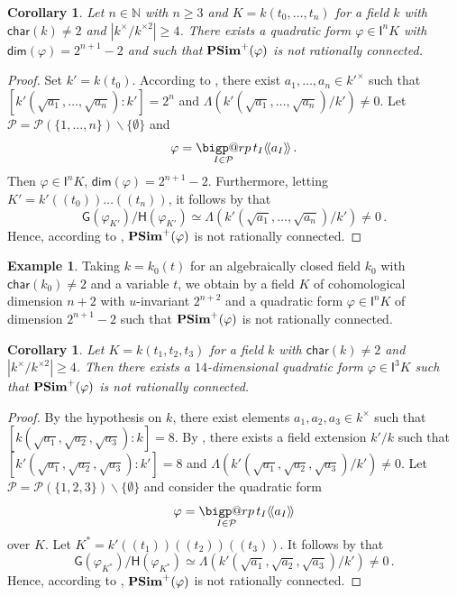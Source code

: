 \documentclass[twoside,11pt]{amsart}
\makeatletter
\numberwithin{equation}{section}
\newtheorem{cor}[equation]{Corollary}
\theoremstyle{definition}
\newtheorem{ex}[equation]{Example}
\renewcommand{\dim}{\operatorname{\mathsf{dim}}}
\newcommand{\car}{\mathsf{char}}
\newcommand{\mg}[1]{{#1}^{\times}}
\newcommand{\sq}[1]{{#1}^{\times 2}}
\newcommand{\scg}[1]{\mg{#1}/\sq{#1}}
\newcommand{\nat}{\mathbb{N}}
\newcommand{\la}{\langle}
\newcommand{\ra}{\rangle}
\newcommand{\lla}{\la\!\la}
\newcommand{\rra}{\ra\!\ra}
\renewcommand{\geq}{\geqslant}
\newcommand{\I}{\mathsf{I}}
\newcommand{\mc}{\mathcal}
\newcommand{\G}{\mathsf{G}}
\renewcommand{\H}{\mathsf{H}}
\renewcommand{\setminus}{\smallsetminus}
\renewcommand{\dim}{\mathsf{dim}}
\renewcommand{\geq}{\geqslant}
\renewcommand{\setminus}{\smallsetminus}
\newcommand{\bigperp}{%
  \mathop{\mathpalette\bigp@rp\relax}%
  \displaylimits
}
\newcommand{\bigp@rp}[2]{%
  \vcenter{
    \m@th\hbox{\scalebox{\ifx#1\displaystyle2.1\else1.5\fi}{$#1\perp$}}
  }%
}
\makeatother
\begin{document}
\begin{cor}\label{In-ex}
    Let $n\in\nat$ with $n\geq 3$ and $K=k(t_0,\dots,t_n)$ for a field $k$ with $\car(k)\neq 2$ and $|\scg{k}|\geq 4$.
    There exists a quadratic form $\varphi\in\I^nK$ with $\dim(\varphi)=2^{n+1}-2$ and such that ${\bf PSim}^+(\varphi)$ is not rationally connected.
\end{cor}
\begin{proof}
    Set $k'=k(t_0)$. According to , there exist $a_1,\dots,a_n\in\mg{k'}$ such that 
    $[k'(\sqrt{a_1},\dots,\sqrt{a_n}):k']=2^n$ and $\Lambda(k'(\sqrt{a_1},\dots,\sqrt{a_n})/k')\neq 0$.
    Let $\mc{P}=\mc{P}(\{1,\dots,n\})\setminus\{\emptyset\}$ and 
    $$\varphi=\bigperp_{I\in \mc{P}}  t_I\lla a_I\rra\,.$$
    Then $\varphi\in\I^nK$, $\dim(\varphi)=2^{n+1}-2$.
    Furthermore, letting $K'=k'(\!(t_0)\!)\ldots(\!(t_n)\!)$, it follows 
    by  that 
    $$\G(\varphi_{K'})/\H(\varphi_{K'})\simeq \Lambda(k'(\sqrt{a_1},\dots,\sqrt{a_n})/k')\neq 0\,.$$
    Hence, according to , ${\bf PSim}^+(\varphi)$ is not rationally connected.
\end{proof}

\begin{ex}\label{E:In-PSim-nrc}
    Taking $k=k_0(t)$ for an algebraically closed field $k_0$ with $\car(k_0)\neq 2$ and a variable $t$, we obtain by  a field $K$ of cohomological dimension $n+2$ with $u$-invariant $2^{n+2}$ and a quadratic form $\varphi\in\I^nK$ of dimension $2^{n+1}-2$ such that ${\bf PSim}^+(\varphi)$ is not rationally connected.
    \end{ex}
    
\begin{cor}\label{14I3ex}
Let $K=k(t_1,t_2,t_3)$ for a field $k$ with $\car(k)\neq 2$ and $|\scg{k}|\geq 4$.
    Then there exists a $14$-dimensional quadratic form $\varphi\in\I^3K$ such that ${\bf PSim}^+(\varphi)$ is not rationally connected.
\end{cor}
\begin{proof}
    By the hypothesis on $k$, there exist elements $a_1,a_2,a_3\in\mg{k}$ such that $[k(\sqrt{a_1},\sqrt{a_2},\sqrt{a_3}):k]=8$.
    By , there exists a field extension $k'/k$ such that $[k'(\sqrt{a_1},\sqrt{a_2},\sqrt{a_3}):k']=8$ and $\Lambda(k'(\sqrt{a_1},\sqrt{a_2},\sqrt{a_3})/k')\neq 0$.
    Let $\mc{P}=\mc{P}(\{1,2,3\})\setminus\{\emptyset\}$ and consider the quadratic form 
    $$\varphi=\bigperp_{I\in\mc{P}} t_I\lla a_I\rra$$
    over $K$.
    Let $K^\ast=k'(\!(t_1)\!)(\!(t_2)\!)(\!(t_3)\!)$.
    It follows by  that 
    $$\G(\varphi_{K^\ast})/\H(\varphi_{K^\ast})\simeq \Lambda(k'(\sqrt{a_1},\sqrt{a_2},\sqrt{a_3})/k')\neq 0\,.$$
    Hence, according to , ${\bf PSim}^+(\varphi)$ is not rationally connected.
\end{proof}
\end{document}

